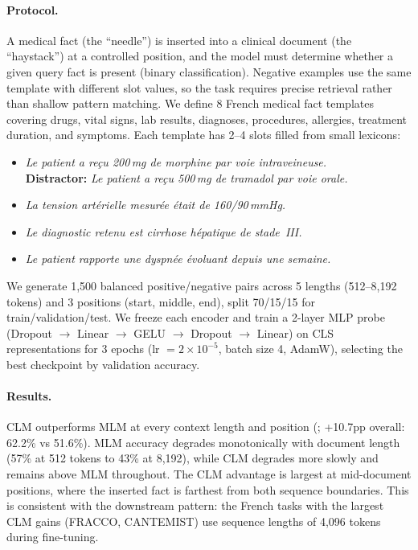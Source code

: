 \paragraph{Protocol.} A medical fact (the ``needle'') is inserted into a clinical document (the ``haystack'') at a controlled position, and the model must determine whether a given query fact is present (binary classification). Negative examples use the same template with different slot values, so the task requires precise retrieval rather than shallow pattern matching. We define 8 French medical fact templates covering drugs, vital signs, lab results, diagnoses, procedures, allergies, treatment duration, and symptoms. Each template has 2--4 slots filled from small lexicons:

\begin{itemize}
  \item \textit{Le patient a re\c{c}u 200\,mg de morphine par voie intraveineuse.}\\
        \textbf{Distractor:} \textit{Le patient a re\c{c}u 500\,mg de tramadol par voie orale.}
  \item \textit{La tension art\'erielle mesur\'ee \'etait de 160/90\,mmHg.}
  \item \textit{Le diagnostic retenu est cirrhose h\'epatique de stade~III.}
  \item \textit{Le patient rapporte une dyspn\'ee \'evoluant depuis une semaine.}
\end{itemize}

\begin{reviewread}
We generate 1,500 balanced positive/negative pairs across 5 lengths (512--8,192 tokens) and 3 positions (start, middle, end), split 70/15/15 for train/validation/test. We freeze each encoder and train a 2-layer MLP probe (Dropout $\to$ Linear $\to$ GELU $\to$ Dropout $\to$ Linear) on CLS representations for 3 epochs (lr $= 2 \times 10^{-5}$, batch size 4, AdamW), selecting the best checkpoint by validation accuracy.
\end{reviewread}

\paragraph{Results.} CLM outperforms MLM at every context length and position (; +10.7pp overall: 62.2\% vs 51.6\%). MLM accuracy degrades monotonically with document length (57\% at 512 tokens to 43\% at 8,192), while CLM degrades more slowly and remains above MLM throughout. The CLM advantage is largest at mid-document positions, where the inserted fact is farthest from both sequence boundaries. This is consistent with the downstream pattern: the French tasks with the largest CLM gains (FRACCO, CANTEMIST) use sequence lengths of 4,096 tokens during fine-tuning.


